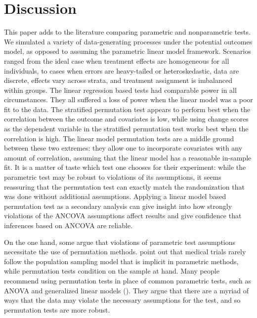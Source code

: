 \documentclass[12pt]{article}
\begin{document}
\section{Discussion}\label{sec:discussion}



This paper adds to the literature comparing parametric and nonparametric tests.
We simulated a variety of data-generating processes under the potential outcomes model, as opposed to assuming the parametric linear model framework.
Scenarios ranged from the ideal case when treatment effects are homogeneous for all individuals, to cases when errors are heavy-tailed or heteroskedastic, data are discrete, effects vary across strata, and treatment assignment is imbalanced within groups.
The linear regression based tests had comparable power in all circumstances.
They all suffered a loss of power when the linear model was a poor fit to the data.
The stratified permutation test appears to perform best when the correlation between the outcome and covariates is low, while using change scores as the dependent variable in the stratified permutation test works best when the correlation is high.
The linear model permutation tests are a middle ground between these two extremes: they allow one to incorporate covariates with any amount of correlation, assuming that the linear model has a reasonable in-sample fit.
It is a matter of taste which test one chooses for their experiment: while the parametric test may be robust to violations of its assumptions, it seems reassuring that the permutation test can exactly match the randomization that was done without additional assumptions.
Applying a linear model based permutation test as a secondary analysis can give insight into how strongly violations of the ANCOVA assumptions affect results
and give confidence that inferences based on ANCOVA are reliable.


On the one hand, some argue that violations of parametric test assumptions necessitate the use of permutation methods.
\cite{ludbrook_why_1998} point out that medical trials rarely follow the population sampling model that is implicit in parametric methods, while permutation tests condition on the sample at hand.
Many people recommend using permutation tests in place of common parametric tests, such as ANOVA and generalized linear models (\cite{still_approximate_1981, winkler_permutation_2014}).
They argue that there are a myriad of ways that the data may violate the necessary assumptions for the test, and so permutation tests are more robust.
\end{document}
